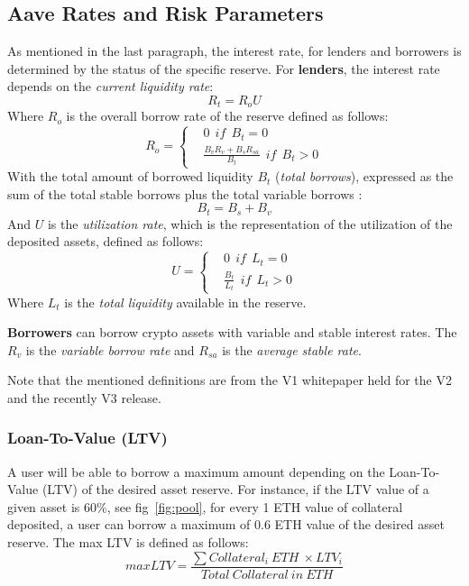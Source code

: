 \documentclass[11pt,a4paper]{report}
\begin{document}
\subsection{Aave Rates and Risk Parameters}\label{rates}
 As mentioned in the last paragraph, the interest rate, for lenders and borrowers is determined by the status of the specific reserve. For \textbf{lenders}, the interest rate depends on  the \textit{current liquidity rate}:
\[ R_{t} = R_{o}U \]
Where $ R_{o} $ is the overall borrow rate of the reserve defined as follows:
\begin{equation}
	R_{o} = 
	\left\{\begin{matrix}
		&  0~~if~~B_{t}=0\\ 
		& \frac{B_{v}R_{v}+ B_{s}R_{sa}}{B_{t}}~~if~~B_{t} > 0
	\end{matrix}\right.
\end{equation}
With the total amount of borrowed liquidity $B_{t} $ (\textit{total borrows}), expressed as the sum of the total stable borrows plus  the total variable borrows :
\[ B_{t} = B_{s}+B_{v} \]
And $ U $ is the \textit{utilization rate}, which is the representation of the utilization of the deposited assets, defined as follows:
\begin{equation}
	U = 
	\left\{\begin{matrix}
		&  0~~if~~L_{t}=0\\ 
		& \frac{B_{t}}{L_{t}}~~if~~L_{t} > 0
	\end{matrix}\right.
\end{equation}
Where $L_{t}$  is the \textit{total liquidity} available in the reserve.

\textbf{Borrowers} can borrow crypto assets with variable and stable interest rates. 
The $R_{v}$\cite{aaveV1RV} is the \textit{variable borrow rate} and $R_{sa}$\cite{aaveV1RS} is the \textit{average stable rate}. 

Note that the mentioned definitions are from the V1\cite{aaveV1} whitepaper held for the V2\cite{aaveV2} and the recently V3\cite{aaveV3} release.

\subsubsection{Loan-To-Value (LTV)} 
A user will be able to borrow a maximum amount depending on the Loan-To-Value (LTV)\cite{aaveV1}\cite{risk} of the desired asset reserve. For instance, if the LTV value of a given asset is  60\%, see fig~\ref{fig:pool}, for every 1 ETH value of collateral deposited, a user can borrow a maximum of 0.6 ETH value of the desired asset reserve. The max LTV is defined as follows:\[ maxLTV = \frac{\sum Collateral_{i}~ETH~\times LTV_{i}}{Total~Collateral~in~ETH} \]
\end{document}
